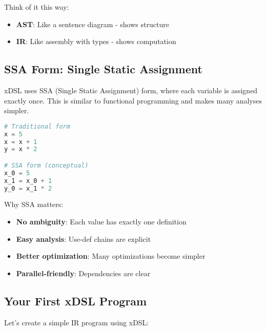 \documentclass[11pt,a4paper]{article}
\begin{document}
Think of it this way:
\begin{itemize}
    \item \textbf{AST}: Like a sentence diagram - shows structure
    \item \textbf{IR}: Like assembly with types - shows computation
\end{itemize}

\subsection{SSA Form: Single Static Assignment}

xDSL uses SSA (Single Static Assignment) form, where each variable is assigned exactly once. This is similar to functional programming and makes many analyses simpler.

\begin{lstlisting}[language=Python, caption=Traditional vs SSA Form]
# Traditional form
x = 5
x = x + 1
y = x * 2

# SSA form (conceptual)
x_0 = 5
x_1 = x_0 + 1
y_0 = x_1 * 2
\end{lstlisting}

Why SSA matters:
\begin{itemize}
    \item \textbf{No ambiguity}: Each value has exactly one definition
    \item \textbf{Easy analysis}: Use-def chains are explicit
    \item \textbf{Better optimization}: Many optimizations become simpler
    \item \textbf{Parallel-friendly}: Dependencies are clear
\end{itemize}

\subsection{Your First xDSL Program}

Let's create a simple IR program using xDSL:
\end{document}
